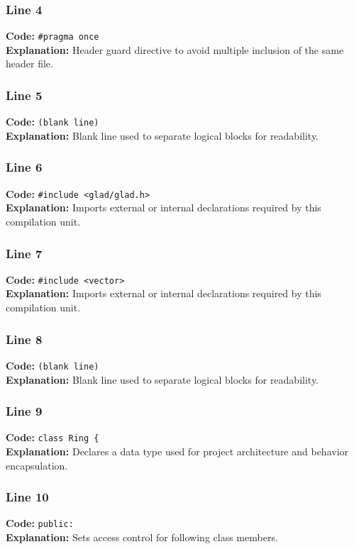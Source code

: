 \documentclass[11pt,a4paper]{article}
\begin{document}
\subsubsection*{Line 4}
\textbf{Code:} \verb|#pragma once|\\
\textbf{Explanation:} Header guard directive to avoid multiple inclusion of the same header file.

\subsubsection*{Line 5}
\textbf{Code:} \texttt{(blank line)}\\
\textbf{Explanation:} Blank line used to separate logical blocks for readability.

\subsubsection*{Line 6}
\textbf{Code:} \verb|#include <glad/glad.h>|\\
\textbf{Explanation:} Imports external or internal declarations required by this compilation unit.

\subsubsection*{Line 7}
\textbf{Code:} \verb|#include <vector>|\\
\textbf{Explanation:} Imports external or internal declarations required by this compilation unit.

\subsubsection*{Line 8}
\textbf{Code:} \texttt{(blank line)}\\
\textbf{Explanation:} Blank line used to separate logical blocks for readability.

\subsubsection*{Line 9}
\textbf{Code:} \verb|class Ring {|\\
\textbf{Explanation:} Declares a data type used for project architecture and behavior encapsulation.

\subsubsection*{Line 10}
\textbf{Code:} \verb|public:|\\
\textbf{Explanation:} Sets access control for following class members.
\end{document}
